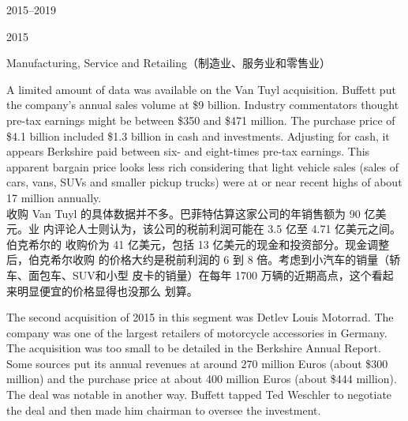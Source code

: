 \begin{chapter}{2015--2019}
\begin{section}{2015}
\begin{subsection}{Manufacturing, Service and Retailing（制造业、服务业和零售业）}
\begin{verseparallel}
  {
    A limited amount of data was available on the Van Tuyl acquisition. Buffett
    put the company’s annual sales volume at \$9 billion. Industry commentators
    thought pre-tax earnings might be between \$350 and \$471 million.
     The purchase price of \$4.1 billion included \$1.3 billion in
    cash and investments. Adjusting for cash, it appears Berkshire paid between
    six- and eight-times pre-tax earnings. This apparent bargain price looks
    less rich considering that light vehicle sales (sales of cars, vans, SUVs
    and smaller pickup trucks) were at or near recent highs of about 17 million
    annually.  \\
  }
  {
    收购 Van Tuyl 的具体数据并不多。巴菲特估算这家公司的年销售额为 90 亿美元。业
    内评论人士则认为，该公司的税前利润可能在 3.5 亿至 4.71 亿美元之间。伯克希尔的
    收购价为 41 亿美元，包括 13 亿美元的现金和投资部分。现金调整后，伯克希尔收购
    的价格大约是税前利润的 6 到 8 倍。考虑到小汽车的销量（轿车、面包车、SUV和小型
    皮卡的销量）在每年 1700 万辆的近期高点，这个看起来明显便宜的价格显得也没那么
    划算。
  }
\end{verseparallel}

\begin{verseparallel}
  {

    The second acquisition of 2015 in this segment was Detlev Louis Motorrad.
    The company was one of the largest retailers of motorcycle accessories in
    Germany. The acquisition was too small to be detailed in the Berkshire
    Annual Report. Some sources put its annual revenues at around 270 million
    Euros (about \$300 million) and the purchase price at about 400 million
    Euros (about \$444 million).  The
    deal was notable in another way. Buffett tapped Ted Weschler to negotiate
    the deal and then made him chairman to oversee the investment. \\

}
\end{verseparallel}
\end{subsection}
\end{section}
\end{chapter}
